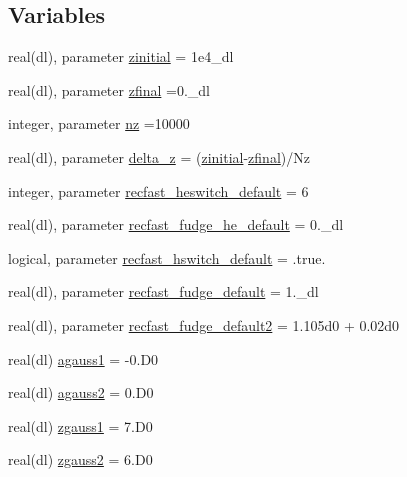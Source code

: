 \subsection*{Variables}
\begin{DoxyCompactItemize}
\item 
real(dl), parameter \mbox{\hyperlink{namespacerecombination_a59aa3ea34247a93b4f4c11b5ca93c97c}{zinitial}} = 1e4\+\_\+dl
\item 
real(dl), parameter \mbox{\hyperlink{namespacerecombination_a6c83801bcb6009615d1c1103da95f91f}{zfinal}} =0.\+\_\+dl
\item 
integer, parameter \mbox{\hyperlink{namespacerecombination_a2ebf98b22953bfe18fb372dd8e330d3e}{nz}} =10000
\item 
real(dl), parameter \mbox{\hyperlink{namespacerecombination_a7f3dac9960d3b472a93e5cf800eb1538}{delta\+\_\+z}} = (\mbox{\hyperlink{namespacerecombination_a59aa3ea34247a93b4f4c11b5ca93c97c}{zinitial}}-\/\mbox{\hyperlink{namespacerecombination_a6c83801bcb6009615d1c1103da95f91f}{zfinal}})/Nz
\item 
integer, parameter \mbox{\hyperlink{namespacerecombination_a517d5a67e1e61e62f788768cb427edd2}{recfast\+\_\+heswitch\+\_\+default}} = 6
\item 
real(dl), parameter \mbox{\hyperlink{namespacerecombination_ae732fad2453ab4c2e0a7ba4c6e5cca43}{recfast\+\_\+fudge\+\_\+he\+\_\+default}} = 0.\+\_\+dl
\item 
logical, parameter \mbox{\hyperlink{namespacerecombination_ab3f90d31e547798b3aa3fc1403d556fb}{recfast\+\_\+hswitch\+\_\+default}} = .true.
\item 
real(dl), parameter \mbox{\hyperlink{namespacerecombination_a198e64f2c7a763d928e647b4e1de4be9}{recfast\+\_\+fudge\+\_\+default}} = 1.\+\_\+dl
\item 
real(dl), parameter \mbox{\hyperlink{namespacerecombination_afe0b5ce72921eaef12df437e7c994273}{recfast\+\_\+fudge\+\_\+default2}} = 1.\+105d0 + 0.\+02d0
\item 
real(dl) \mbox{\hyperlink{namespacerecombination_a3656f16a64eb43f2c0cc9ede42d7739e}{agauss1}} = -\/0.\+D0
\item 
real(dl) \mbox{\hyperlink{namespacerecombination_ac630e24e5948bae78946e725278366d0}{agauss2}} = 0.\+D0
\item 
real(dl) \mbox{\hyperlink{namespacerecombination_aa4dbcaadd19727bcb40044d8bd9cd923}{zgauss1}} = 7.\+D0
\item 
real(dl) \mbox{\hyperlink{namespacerecombination_a61e4b85fa7e6dbab34fdcc71cbf2ac51}{zgauss2}} = 6.\+D0

\end{DoxyCompactItemize}
